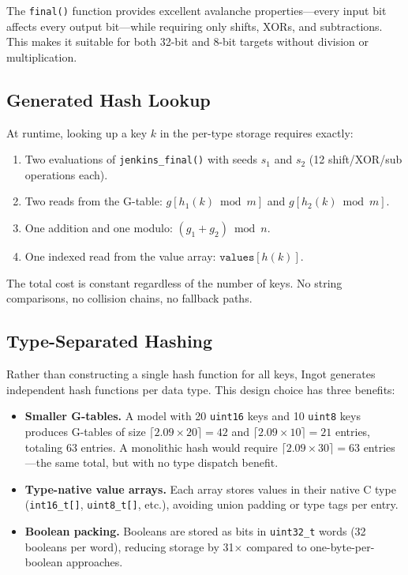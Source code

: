 \documentclass[10pt,twocolumn,letterpaper]{article}
\begin{document}
The \texttt{final()} function provides excellent avalanche
properties---every input bit affects every output bit---while
requiring only shifts, XORs, and subtractions.  This makes it
suitable for both 32-bit and 8-bit targets without division or
multiplication.

\subsection{Generated Hash Lookup}

At runtime, looking up a key $k$ in the per-type storage requires
exactly:

\begin{enumerate}
    \item Two evaluations of \texttt{jenkins\_final()} with seeds
        $s_1$ and $s_2$ (12 shift/XOR/sub operations each).
    \item Two reads from the G-table: $g[h_1(k) \bmod m]$ and
        $g[h_2(k) \bmod m]$.
    \item One addition and one modulo: $(g_1 + g_2) \bmod n$.
    \item One indexed read from the value array: $\texttt{values}[h(k)]$.
\end{enumerate}

The total cost is constant regardless of the number of keys.  No
string comparisons, no collision chains, no fallback paths.

\subsection{Type-Separated Hashing}

Rather than constructing a single hash function for all keys, Ingot
generates independent hash functions per data type.  This design
choice has three benefits:

\begin{itemize}
    \item \textbf{Smaller G-tables.}  A model with 20 \texttt{uint16}
        keys and 10 \texttt{uint8} keys produces G-tables of size
        $\lceil 2.09 \times 20 \rceil = 42$ and $\lceil 2.09 \times
        10 \rceil = 21$ entries, totaling 63 entries.  A monolithic
        hash would require $\lceil 2.09 \times 30 \rceil = 63$
        entries---the same total, but with no type dispatch benefit.
    \item \textbf{Type-native value arrays.}  Each array stores values
        in their native C type (\texttt{int16\_t[]},
        \texttt{uint8\_t[]}, etc.), avoiding union padding or type
        tags per entry.
    \item \textbf{Boolean packing.}  Booleans are stored as bits in
        \texttt{uint32\_t} words (32 booleans per word), reducing
        storage by 31$\times$ compared to one-byte-per-boolean
        approaches.
\end{itemize}
\end{document}
